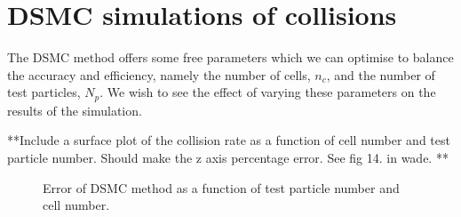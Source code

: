 \section{DSMC simulations of collisions}

The DSMC method offers some free parameters which we can optimise to balance the accuracy and efficiency, namely the number of cells, $n_c$, and the number of test particles, $N_p$.
We wish to see the effect of varying these parameters on the results of the simulation.

**Include a surface plot of the collision rate as a function of cell number and test particle number.
Should make the z axis percentage error. See fig 14. in wade. **

\begin{figure}
\hspace{-12.5em}
\caption{Error of DSMC method as a function of test particle number and cell number.}\label{fig:dsmccolerr}
\end{figure}

